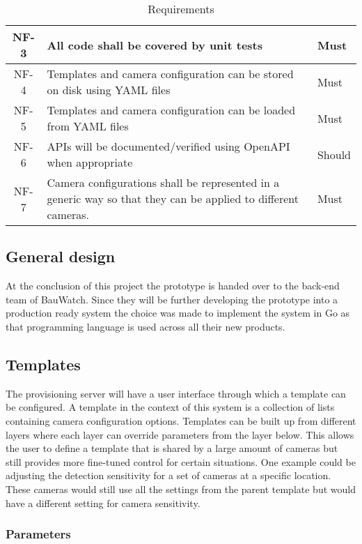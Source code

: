 \begin{table}[h]
\begin{tabulary}{\linewidth}{CLL}
        \\ \hline
        NF-3 & All code shall be covered by unit tests & Must
        \\ \hline
        NF-4 & Templates and camera configuration can be stored on disk using YAML files & Must
        \\ \hline
        NF-5 & Templates and camera configuration can be loaded from YAML files & Must
        \\ \hline %
        NF-6 & APIs will be documented/verified using OpenAPI when appropriate & Should
        \\ \hline
        NF-7 & Camera configurations shall be represented in a generic way so that they can be applied to different cameras. & Must
    \end{tabulary}
    \caption{Requirements}
    \label{tab:requirements}
\end{table}

\subsection{General design}
At the conclusion of this project the prototype is handed over to the back-end team of BauWatch.
Since they will be further developing the prototype into a production ready system the choice was made to implement the system in Go as that programming language is used across all their new products.

\subsection{Templates}
The provisioning server will have a user interface through which a template can be configured. A template in the context of this system is a collection of lists containing camera configuration options. Templates can be built up from different layers where each layer can override
parameters from the layer below. This allows the user to define a template that is shared by a large amount of cameras but still provides
more fine-tuned control for certain situations. One example could be adjusting the detection sensitivity for a set of cameras at a specific
location. These cameras would still use all the settings from the parent template but would have a different setting for camera sensitivity.

\subsubsection{Parameters}

